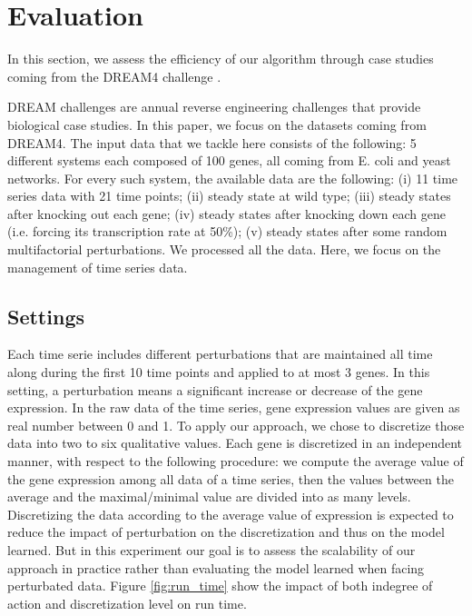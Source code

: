 \section{Evaluation}
	\label{sec:evaluation}
	
	In this section, we assess the efficiency of our algorithm through case studies coming from the DREAM4 challenge \cite{prill2011crowdsourcing}.

	DREAM challenges are annual reverse engineering challenges that provide biological case studies.
	In this paper, we focus on the datasets coming from DREAM4.
	The input data that we tackle here consists of the following:
	5 different systems each composed of 100 genes, all coming from E. coli and yeast networks. For every such system,
	the available data are the following: (i) 11 time series data with 21 time points; (ii) steady state at wild type;
	(iii) steady states after knocking out each gene;
	(iv) steady states after knocking down each gene (i.e. forcing its transcription rate at 50\%);
	(v) steady states after some random multifactorial perturbations. We processed all the data.
	Here, we focus on the management of time series data.

\subsection{Settings}

	Each time serie includes different perturbations that are maintained all time along during the first 10 time points and applied to at most 3 genes.
	In this setting, a perturbation means a significant increase or decrease of the gene expression.
	In the raw data of the time series, gene expression values are given as real number between 0 and 1.
	To apply our approach, we chose to discretize those data into two to six qualitative values.
	Each gene is discretized in an independent manner, with respect to the following procedure:
	we compute the average value of the gene expression among all data of a time series,
	then the values between the average and the maximal/minimal value are divided into as many levels.
	Discretizing the data according to the average value of expression is expected to reduce the impact of perturbation on the discretization and thus on the model learned.
	But in this experiment our goal is to assess the scalability of our approach in practice rather than evaluating the model learned when facing perturbated data.
	Figure \ref{fig:run_time} show the impact of both indegree of action and discretization level on run time.

